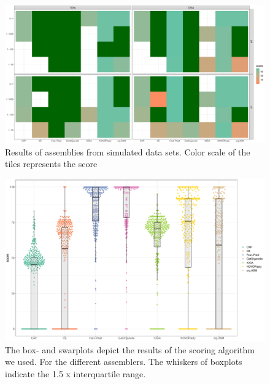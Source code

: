 \documentclass{bmcart}
\begin{document}
\begin{backmatter}
\begin{figure}[h!]
  \includegraphics[width=\textwidth]{sim_tiles.pdf}
  \caption{
      Results of assemblies from simulated data sets. Color scale of the tiles represents the score }
      \label{fig:simulated}
      \end{figure}

  \begin{figure}[h!]
  \includegraphics[width=\textwidth]{swarm.pdf}
  \caption{
  The box- and swarplots depict the results of the scoring algorithm we used. For the different assemblers. The whiskers of boxplots indicate the 1.5 x interquartile range. 
    }
      \label{fig:swarmplot}
      \end{figure}


\end{backmatter}
\end{document}
